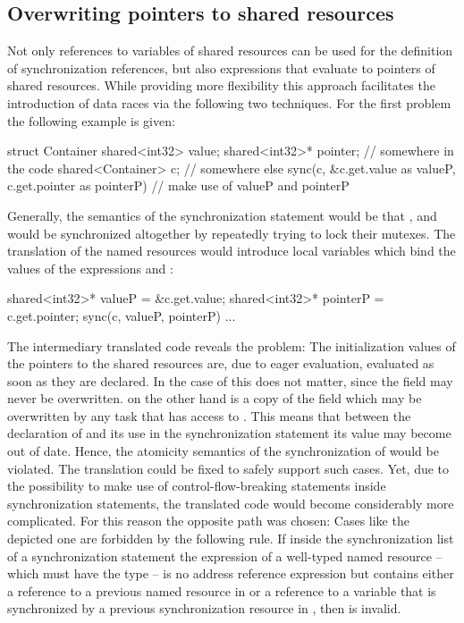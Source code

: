 \subsection{Overwriting pointers to shared resources}
Not only references to variables of shared resources can be used for the definition of synchronization references, but also expressions that evaluate to pointers of shared resources. While providing more flexibility this approach facilitates the introduction of data races via the following two techniques. For the first problem the following example is given:
\begin{ccode}
struct Container {
  shared<int32> value;
  shared<int32>* pointer;
}
// somewhere in the code
shared<Container> c;
// somewhere else
sync(c, &c.get.value as valueP, c.get.pointer as pointerP) {
  // make use of valueP and pointerP
}
\end{ccode}
Generally, the semantics of the synchronization statement would be that ,  and  would be synchronized altogether by repeatedly trying to lock their mutexes. The translation of the named resources would introduce local variables which bind the values of the expressions  and :
\begin{ccode}
shared<int32>* valueP = &c.get.value;
shared<int32>* pointerP = c.get.pointer;
sync(c, valueP, pointerP) {...}
\end{ccode}
The intermediary translated code reveals the problem: The initialization values of the pointers to the shared resources are, due to eager evaluation, evaluated as soon as they are declared. In the case of  this does not matter, since the  field may never be overwritten.  on the other hand is a copy of the field  which may be overwritten by any task that has access to . This means that between the declaration of  and its use in the synchronization statement its value may become out of date. Hence, the atomicity semantics of the synchronization of  would be violated. The translation could be fixed to safely support such cases. Yet, due to the possibility to make use of control-flow-breaking statements inside synchronization statements, the translated code would become considerably more complicated. For this reason the opposite path was chosen: Cases like the depicted one are forbidden by the following rule. If inside the synchronization list  of a synchronization statement the expression of a well-typed named resource  -- which must have the type  -- is no address reference expression  but contains either a reference to a previous named resource in  or a reference to a variable that is synchronized by a previous synchronization resource in , then  is invalid.


